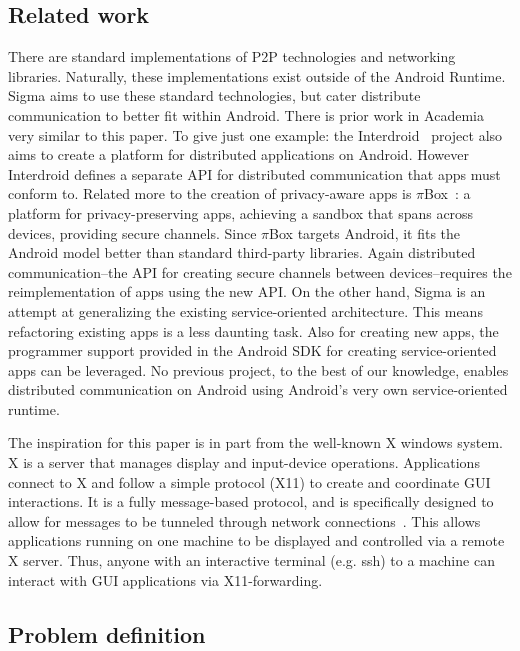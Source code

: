 \documentclass[prodmode]{acmlarge}
\begin{document}
\subsection{Related work}
There are standard implementations of P2P technologies and networking libraries. Naturally, these implementations exist outside of the Android Runtime. Sigma aims to use these standard technologies, but cater distribute communication to better fit within Android. There is prior work in Academia very similar to this paper. To give just one example: the Interdroid~\cite{Interdroid} project also aims to create a platform for distributed applications on Android. However Interdroid defines a separate API for distributed communication that apps must conform to. Related more to the creation of privacy-aware apps is $\pi$Box~\cite{piBox}: a platform for privacy-preserving apps, achieving a sandbox that spans across devices, providing secure channels. Since $\pi$Box targets Android, it fits the Android model better than standard third-party libraries. Again distributed communication--the API for creating secure channels between devices--requires the reimplementation of apps using the new API. On the other hand, Sigma is an attempt at generalizing the existing service-oriented architecture. This means refactoring existing apps is a less daunting task. Also for creating new apps, the programmer support provided in the Android SDK for creating service-oriented apps can be leveraged. No previous project, to the best of our knowledge, enables distributed communication on Android using Android's very own service-oriented runtime.

The inspiration for this paper is in part from the well-known X windows system. X is a server that manages display and input-device operations. Applications connect to X and follow a simple protocol (X11) to create and coordinate GUI interactions. It is a fully message-based protocol, and is specifically designed to allow for messages to be tunneled through network connections~\cite{X11}. This allows applications running on one machine to be displayed and controlled via a remote X server. Thus, anyone with an interactive terminal (e.g. ssh) to a machine can interact with GUI applications via X11-forwarding.

\subsection{Problem definition}
\end{document}
